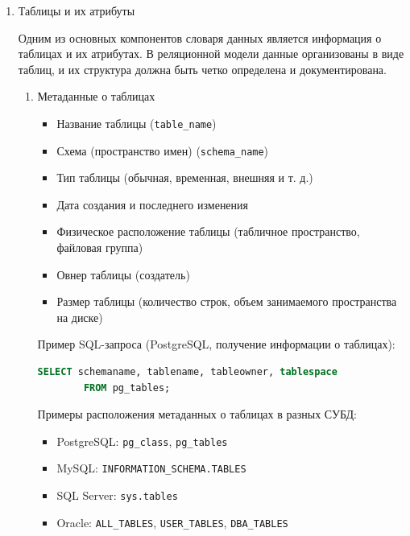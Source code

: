 \begin{enumerate}

    \item Таблицы и их атрибуты \autocites[§51.11]{PostgreSQLdocc51}[§28.3.38]{Mysqldoc1}{MicrosoftLearnSQLserver}

    Одним из основных компонентов словаря данных является информация о таблицах и их атрибутах. В реляционной модели данные организованы в виде таблиц, и их структура должна быть четко определена и документирована.

    \begin{enumerate}
        \item Метаданные о таблицах

        \begin{itemize}
            \item Название таблицы (\texttt{table\_name})
            \item Схема (пространство имен) (\texttt{schema\_name})
            \item Тип таблицы (обычная, временная, внешняя и т. д.)
            \item Дата создания и последнего изменения
            \item Физическое расположение таблицы (табличное пространство, файловая группа)
            \item Овнер таблицы (создатель)
            \item Размер таблицы (количество строк, объем занимаемого пространства на диске)
        \end{itemize}

        Пример SQL-запроса (PostgreSQL, получение информации о таблицах):
        \begin{lstlisting}[language=SQL]
        SELECT schemaname, tablename, tableowner, tablespace 
        FROM pg_tables;
        \end{lstlisting}

        Примеры расположения метаданных о таблицах в разных СУБД:
        \begin{itemize}
            \item PostgreSQL: \texttt{pg\_class}, \texttt{pg\_tables}
            \item MySQL: \texttt{INFORMATION\_SCHEMA.TABLES}
            \item SQL Server: \texttt{sys.tables}
            \item Oracle: \texttt{ALL\_TABLES}, \texttt{USER\_TABLES}, \texttt{DBA\_TABLES}
        \end{itemize}


\end{enumerate}
\end{enumerate}
